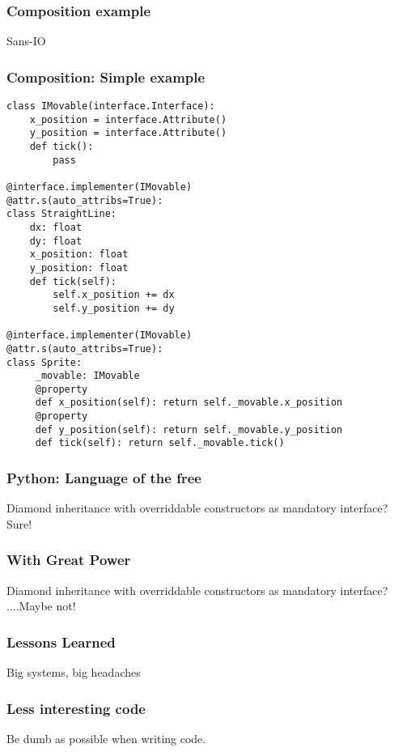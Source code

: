 \begin{frame}[fragile]
\frametitle{Composition example}
Sans-IO
\end{frame}

\begin{frame}[fragile]
\frametitle{Composition: Simple example}
\begin{lstlisting}
class IMovable(interface.Interface):
    x_position = interface.Attribute()
    y_position = interface.Attribute()
    def tick():
        pass

@interface.implementer(IMovable)
@attr.s(auto_attribs=True):
class StraightLine:
    dx: float
    dy: float
    x_position: float
    y_position: float
    def tick(self):
        self.x_position += dx
        self.y_position += dy

@interface.implementer(IMovable)
@attr.s(auto_attribs=True):
class Sprite:
     _movable: IMovable
     @property
     def x_position(self): return self._movable.x_position
     @property
     def y_position(self): return self._movable.y_position
     def tick(self): return self._movable.tick()
\end{lstlisting}

\end{frame}

\begin{frame}[fragile]
\frametitle{Python: Language of the free}

Diamond inheritance with overriddable constructors as mandatory interface?
Sure!
\end{frame}

\begin{frame}[fragile]
\frametitle{With Great Power}

Diamond inheritance with overriddable constructors as mandatory interface?
....Maybe not!
\end{frame}

\begin{frame}[fragile]
\frametitle{Lessons Learned}

Big systems, big headaches
\end{frame}

\begin{frame}[fragile]
\frametitle{Less interesting code}

Be dumb as possible when writing code.

\end{frame}


